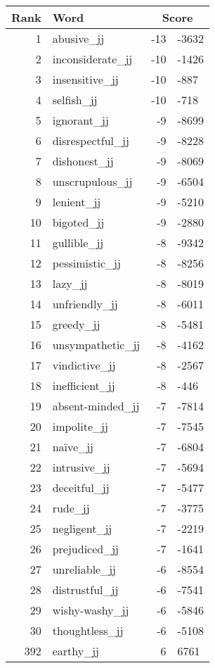 \begin{longtable}[!htbp]{| rlr@{.}l |}
    \hline
    \textbf{Rank} & \textbf{Word} & \multicolumn{2}{c|}{\textbf{Score}} \\
    \hline
    \endhead
    1 & abusive\_jj & -13 & -3632 \\
    2 & inconsiderate\_jj & -10 & -1426 \\
    3 & insensitive\_jj & -10 & -887 \\
    4 & selfish\_jj & -10 & -718 \\
    5 & ignorant\_jj & -9 & -8699 \\
    6 & disrespectful\_jj & -9 & -8228 \\
    7 & dishonest\_jj & -9 & -8069 \\
    8 & unscrupulous\_jj & -9 & -6504 \\
    9 & lenient\_jj & -9 & -5210 \\
    10 & bigoted\_jj & -9 & -2880 \\
    11 & gullible\_jj & -8 & -9342 \\
    12 & pessimistic\_jj & -8 & -8256 \\
    13 & lazy\_jj & -8 & -8019 \\
    14 & unfriendly\_jj & -8 & -6011 \\
    15 & greedy\_jj & -8 & -5481 \\
    16 & unsympathetic\_jj & -8 & -4162 \\
    17 & vindictive\_jj & -8 & -2567 \\
    18 & inefficient\_jj & -8 & -446 \\
    19 & absent-minded\_jj & -7 & -7814 \\
    20 & impolite\_jj & -7 & -7545 \\
    21 & naïve\_jj & -7 & -6804 \\
    22 & intrusive\_jj & -7 & -5694 \\
    23 & deceitful\_jj & -7 & -5477 \\
    24 & rude\_jj & -7 & -3775 \\
    25 & negligent\_jj & -7 & -2219 \\
    26 & prejudiced\_jj & -7 & -1641 \\
    27 & unreliable\_jj & -6 & -8554 \\
    28 & distrustful\_jj & -6 & -7541 \\
    29 & wishy-washy\_jj & -6 & -5846 \\
    30 & thoughtless\_jj & -6 & -5108 \\
    392 & earthy\_jj & 6 & 6761 \\

\end{longtable}
